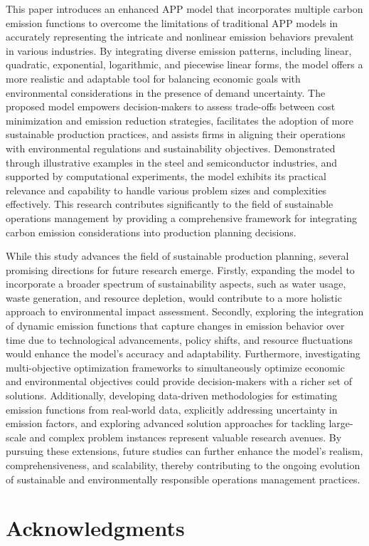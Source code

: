 \documentclass[final,3p,times,review,authoryear]{elsarticle}
\begin{document}
\label{sec:con}
This paper introduces an enhanced APP model that incorporates multiple carbon emission functions to overcome the limitations of traditional APP models in accurately representing the intricate and nonlinear emission behaviors prevalent in various industries. By integrating diverse emission patterns, including linear, quadratic, exponential, logarithmic, and piecewise linear forms, the model offers a more realistic and adaptable tool for balancing economic goals with environmental considerations in the presence of demand uncertainty. The proposed model empowers decision-makers to assess trade-offs between cost minimization and emission reduction strategies, facilitates the adoption of more sustainable production practices, and assists firms in aligning their operations with environmental regulations and sustainability objectives. Demonstrated through illustrative examples in the steel and semiconductor industries, and supported by computational experiments, the model exhibits its practical relevance and capability to handle various problem sizes and complexities effectively. This research contributes significantly to the field of sustainable operations management by providing a comprehensive framework for integrating carbon emission considerations into production planning decisions.

While this study advances the field of sustainable production planning, several promising directions for future research emerge. Firstly, expanding the model to incorporate a broader spectrum of sustainability aspects, such as water usage, waste generation, and resource depletion, would contribute to a more holistic approach to environmental impact assessment. Secondly, exploring the integration of dynamic emission functions that capture changes in emission behavior over time due to technological advancements, policy shifts, and resource fluctuations would enhance the model's accuracy and adaptability. Furthermore, investigating multi-objective optimization frameworks to simultaneously optimize economic and environmental objectives could provide decision-makers with a richer set of solutions. Additionally, developing data-driven methodologies for estimating emission functions from real-world data, explicitly addressing uncertainty in emission factors, and exploring advanced solution approaches for tackling large-scale and complex problem instances represent valuable research avenues. By pursuing these extensions, future studies can further enhance the model's realism, comprehensiveness, and scalability, thereby contributing to the ongoing evolution of sustainable and environmentally responsible operations management practices.




\section*{Acknowledgments}



\appendix





\end{document}
